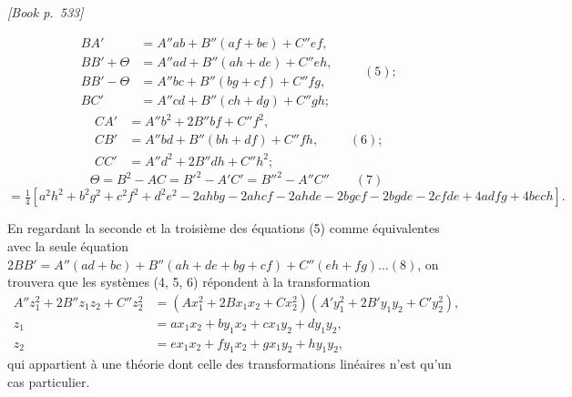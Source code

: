 \documentclass[11pt]{article}
\begin{document}
\medskip
\noindent\textit{[Book p.~533]}\hfill

\smallskip

\[
\begin{aligned}
BA' &= A''ab + B''(af + be) + C''ef,\\
BB' + \Theta &= A''ad + B''(ah + de) + C''eh,\\
BB' - \Theta &= A''bc + B''(bg + cf) + C''fg,\\
BC' &= A''cd + B''(ch + dg) + C''gh;
\end{aligned}\qquad (5);
\]
\[
\begin{aligned}
CA' &= A''b^{2} + 2B''bf + C''f^{2},\\
CB' &= A''bd + B''(bh + df) + C''fh,\\
CC' &= A''d^{2} + 2B''dh + C''h^{2};
\end{aligned}\qquad (6);
\]
\[
\Theta = B^{2} - AC = B'^{2} - A'C' = B''^{2} - A''C''\qquad (7)
\]
\[
= \tfrac{1}{4}[a^{2}h^{2} + b^{2}g^{2} + c^{2}f^{2} + d^{2}e^{2} - 2ahbg - 2ahcf - 2ahde - 2bgcf - 2bgde - 2cfde + 4adfg + 4bech].
\]

En regardant la seconde et la troisi\`eme des \'equations (5) comme \'equivalentes avec la seule \'equation $2BB' = A''(ad + bc) + B''(ah + de + bg + cf) + C''(eh + fg)\dots(8)$, on trouvera que les syst\`emes (4, 5, 6) r\'epondent \`a la transformation
\[
\begin{aligned}
A''z_{1}^{2} + 2B'' z_{1} z_{2} + C'' z_{2}^{2} &= (A x_{1}^{2} + 2 B x_{1} x_{2} + C x_{2}^{2})(A' y_{1}^{2} + 2 B' y_{1} y_{2} + C' y_{2}^{2}),\\
z_{1} &= a x_{1} x_{2} + b y_{1} x_{2} + c x_{1} y_{2} + d y_{1} y_{2},\\
z_{2} &= e x_{1} x_{2} + f y_{1} x_{2} + g x_{1} y_{2} + h y_{1} y_{2},
\end{aligned}
\]
qui appartient \`a une th\'eorie dont celle des transformations lin\'eaires n'est qu'un cas particulier.
\end{document}
